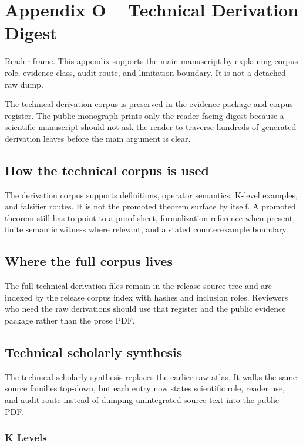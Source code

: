 \section{Appendix O -- Technical Derivation Digest}
Reader frame. This appendix supports the main manuscript by explaining corpus role, evidence class, audit route, and limitation boundary. It is not a detached raw dump.


\label{sec:oc-core-1-3-technical-derivation-atlas}

The technical derivation corpus is preserved in the evidence package and corpus register. The public monograph prints only the reader-facing digest because a scientific manuscript should not ask the reader to traverse hundreds of generated derivation leaves before the main argument is clear.


\subsection{How the technical corpus is used}

The derivation corpus supports definitions, operator semantics, K-level examples, and falsifier routes. It is not the promoted theorem surface by itself. A promoted theorem still has to point to a proof sheet, formalization reference when present, finite semantic witness where relevant, and a stated counterexample boundary.


\subsection{Where the full corpus lives}

The full technical derivation files remain in the release source tree and are indexed by the release corpus index with hashes and inclusion roles. Reviewers who need the raw derivations should use that register and the public evidence package rather than the prose PDF.


\subsection{Technical scholarly synthesis}

The technical scholarly synthesis replaces the earlier raw atlas. It walks the same source families top-down, but each entry now states scientific role, reader use, and audit route instead of dumping unintegrated source text into the public PDF.


\subsubsection{K Levels}

